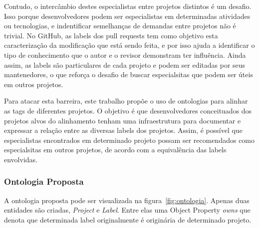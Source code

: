 \documentclass[sigconf]{acmart}
\begin{document}
Contudo, o intercâmbio destes especialistas entre projetos distintos é um desafio. Isso porque desenvolvedores podem ser especialistas em determinadas atividades ou tecnologias, e indentificar semelhanças de demandas entre projetos não é trivial. No GitHub, as labels dos pull requests tem como objetivo esta caracterização da modificação que está sendo feita, e por isso ajuda a identificar o tipo de conhecimento que o autor e o revisor demonstram ter influência. Ainda assim, as labels são particulares de cada projeto e podem ser editadas por seus mantenedores, o que reforça o desafio de buscar especialsitas que podem ser úteis em outros projetos.

Para atacar esta barreira, este trabalho propõe o uso de ontologias para alinhar as tags de diferentes projetos. O objetivo é que desenvolvedores conceituados dos projetos alvos do alinhamento tenham uma infraestrutura para documentar e expressar a relação entre as diversas labels dos projetos. Assim, é possível que especialistas encontrados em determinado projeto possam ser recomendados como especialsitas em outros projetos, de acordo com a equivalência das labels envolvidas.

\subsubsection{Ontologia Proposta}

A ontologia proposta pode ser visualizada na figura~\ref{fig:ontologia}. Apenas duas entidades são criadas, \textit{Project} e \textit{Label}. Entre elas uma Object Property \textit{owns} que denota que determinada label originalmente é originária de determinado projeto.
\end{document}
